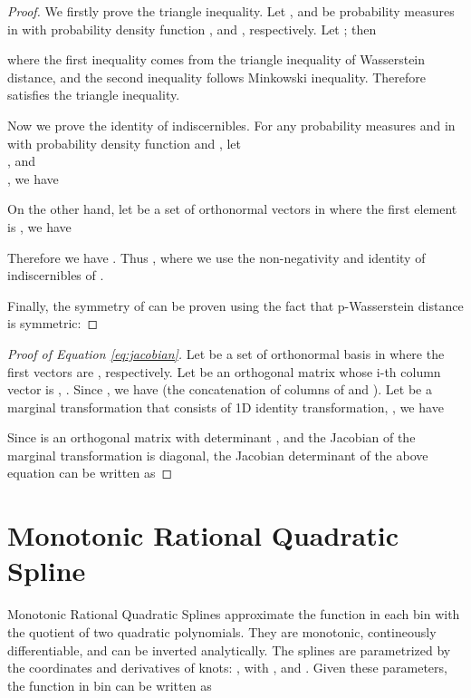 \documentclass{article}
\begin{document}
\begin{proof}
We firstly prove the triangle inequality.
Let ,  and  be probability measures in  with probability density function ,  and , respectively. 
Let ; then

where the first inequality comes from the triangle inequality of Wasserstein distance, and the second inequality follows Minkowski inequality. Therefore  satisfies the triangle inequality.

Now we prove the identity of indiscernibles. For any probability measures  and  in  with probability density function  and , let \\
, and\\
, we have

On the other hand, let  be a set of orthonormal vectors in  where the first element is , we have 

Therefore we have . Thus , where we use the non-negativity and identity of indiscernibles of .

Finally, the symmetry of  can be proven using the fact that p-Wasserstein distance is symmetric:

\end{proof}

\begin{proof}[Proof of Equation \ref{eq:jacobian}]
Let  be a set of orthonormal basis in  where the first  vectors are , respectively. Let  be an orthogonal matrix whose i-th column vector is , . Since , we have  (the concatenation of columns of  and ). Let  be a marginal transformation that consists of  1D identity transformation,  , we have


Since  is an orthogonal matrix with determinant , and the Jacobian of the marginal transformation  is diagonal, the Jacobian determinant of the above equation can be written as

\end{proof}


\section{Monotonic Rational Quadratic Spline}
\label{sec:RQspline}

Monotonic Rational Quadratic Splines \citep{gregory1982piecewise, durkan2019neural} approximate the function in each bin with the quotient of two quadratic polynomials. They are monotonic, contineously differentiable, and can be inverted analytically. The splines are parametrized by the coordinates and derivatives of  knots: , with ,  and . Given these parameters, the function in bin  can be written as \citep{durkan2019neural}
\end{document}
